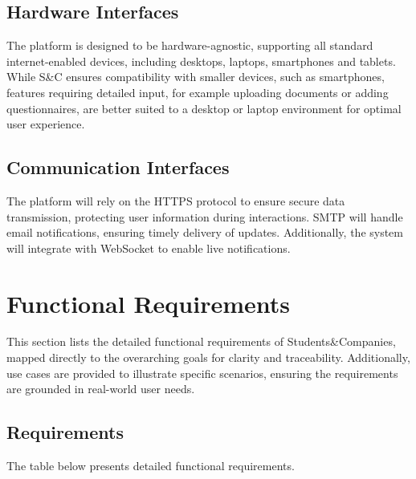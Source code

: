 \subsection{Hardware Interfaces}
The platform is designed to be hardware-agnostic, supporting all standard internet-enabled devices, including desktops, laptops, smartphones and tablets.
While S\&C ensures compatibility with smaller devices, such as smartphones, features requiring detailed input, for example uploading documents or adding questionnaires, are better suited to a desktop or laptop environment for optimal user experience.

\subsection{Communication Interfaces}
The platform will rely on the HTTPS protocol to ensure secure data transmission, protecting user information during interactions.
SMTP will handle email notifications, ensuring timely delivery of updates.
Additionally, the system will integrate with WebSocket to enable live notifications.

\section{Functional Requirements}
This section lists the detailed functional requirements of Students\&Companies, mapped directly to the overarching goals for clarity and traceability.
Additionally, use cases are provided to illustrate specific scenarios, ensuring the requirements are grounded in real-world user needs.

\subsection{Requirements}
The table below presents detailed functional requirements.

